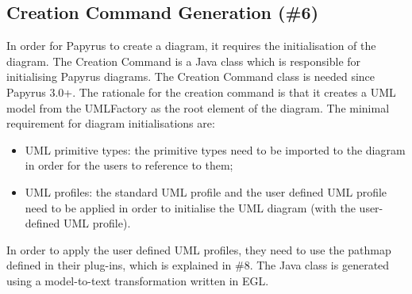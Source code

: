 \subsection{Creation Command Generation (\#6)}
\label{sec:creationCommand}
In order for Papyrus to create a diagram, it requires the initialisation of the diagram.
The Creation Command is a Java class which is responsible for initialising Papyrus diagrams. 
The Creation Command class is needed since Papyrus 3.0+.
The rationale for the creation command is that it creates a UML model from the UMLFactory as the root element of the diagram.
The minimal requirement for diagram initialisations are:
\begin{itemize}
	\item UML primitive types: the primitive types need to be imported to the diagram in order for the users to reference to them;
	\item UML profiles: the standard UML profile and the user defined UML profile need to be applied in order to initialise the UML diagram (with the user-defined UML profile).
\end{itemize}

In order to apply the user defined UML profiles, they need to use the pathmap defined in their plug-ins, which is explained in \#8.
The Java class is generated using a model-to-text transformation written in EGL.

